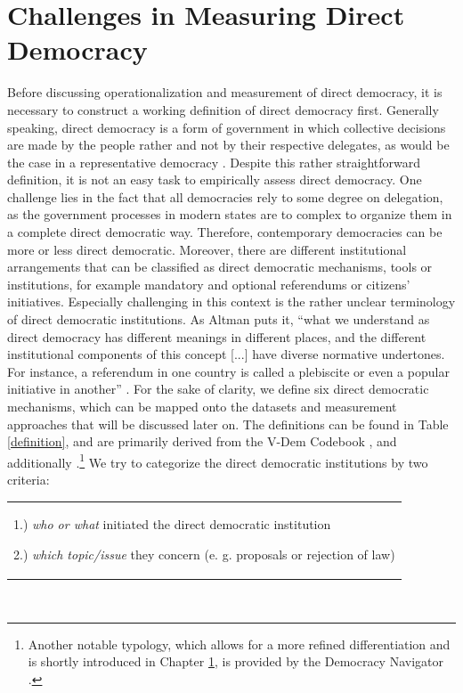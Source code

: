 \documentclass{systats}
\begin{document}

\section{Challenges in Measuring Direct Democracy} \label{challenges}

Before discussing operationalization and measurement of direct democracy, it is necessary to construct a working definition of direct democracy first. Generally speaking, direct democracy is a form of government in which collective decisions are made by the people rather and not by their respective delegates, as would be the case in a representative democracy  \citep[cf.][499]{clark2018}. Despite this rather straightforward definition,  it is not an easy task to empirically assess direct democracy. One challenge lies in the fact that all democracies rely to some degree on delegation, as the government processes in modern states are to complex to organize them in a complete direct democratic way. Therefore, contemporary democracies can be more or less direct democratic. Moreover, there are different institutional arrangements that can be classified as direct democratic mechanisms, tools or institutions, for example mandatory and optional referendums or citizens’ initiatives. Especially challenging in this context is the rather unclear terminology of direct democratic institutions. As Altman puts it, “what we understand as direct democracy has different meanings in different places, and the different institutional components of this concept [...] have diverse normative undertones. For instance, a referendum in one country is called a plebiscite or even a popular initiative in another” \citep[][1208]{altman2017}. For the sake of clarity, we define six direct democratic mechanisms, which can be mapped onto the datasets and measurement approaches that will be discussed later on. The definitions can be found in Table \ref{definition}, and are primarily derived from the V-Dem Codebook \citeyearpar[][138]{coppedge2017v}, and additionally \citealp[][ 9-14]{ideahandbook}.\footnote{Another notable typology, which allows for a more refined differentiation and is shortly introduced in Chapter \ref{challenges}, is provided by the Democracy Navigator \citep[][]{demnavtypology}.} We try to categorize the direct democratic institutions by two criteria: 

\vspace{0.2cm}
\begin{tabular}{p{13.5cm}}
	1.) \textit{who or what} initiated the direct democratic institution 
	
	2.) \textit{which topic/issue} they concern 
	\vspace{0.02cm}
	(e. g. proposals or rejection of law)
\end{tabular}\\
\end{document}
